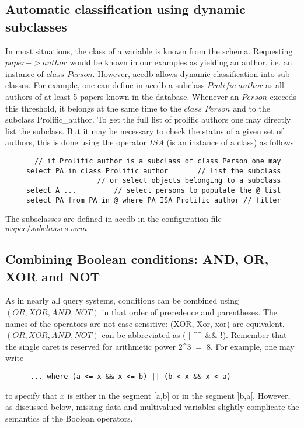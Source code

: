 \documentclass[11pt]{article}
\newcommand{\BL}{\begin{lstlisting}}
\begin{document}
\subsection {Automatic classification using dynamic subclasses}
In most situations, the class of a variable is known from the schema. Requesting $paper$$-$$>$$author$
would be known in our examples as yielding an author, i.e. an instance of $class$ $Person$.
However, acedb allows dynamic classification into sub-classes. For example, one can define
in acedb a subclass $Prolific\_author$ as all authors of at least 5 papers
known in the database. Whenever an $Person$ exceeds this threshold, 
it belongs at the same time to the $class$ $Person$ and to the subclass Prolific\_author. 
To get the full list of prolific authors one may directly list the subclass. 
But it may be necessary to check the status of
a given set of authors, this is done using the operator $ISA$ (is an instance of a class)
as follows

\BL
       // if Prolific_author is a subclass of class Person one may 
     select PA in class Prolific_author       // list the subclass
                      // or select objects belonging to a subclass
     select A ...         // select persons to populate the @ list
     select PA from PA in @ where PA ISA Prolific_author // filter
\end{lstlisting}
The subsclasses are defined in acedb in the configuration file $wspec/subclasses.wrm$

\subsection{Combining Boolean conditions: AND, OR, XOR and NOT}

As in nearly all query systems, conditions can be combined using $(OR, XOR, AND, NOT)$ 
in that order of precedence and parentheses. The names of the operators 
are not case sensitive: (XOR, Xor, xor) are equivalent.
$(OR, XOR, AND, NOT)$ can be abbreviated as ($||$ \^{ }\^{ }  $\&\&$ $!$).
Remember that the single caret is reserved for arithmetic power $2$\^{ }$3 \; = \;8$.
For example, one may write
\BL
      ... where (a <= x && x <= b) || (b < x && x < a) 
\end{lstlisting}
to specify that $x$ is either in the segment [a,b] or in the segment ]b,a[.
However, as discussed below, missing data and multivalued variables
slightly complicate the semantics of the Boolean operators. 


\end{document}
